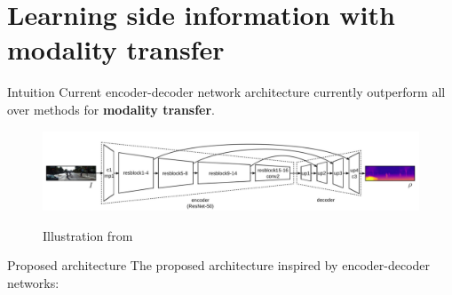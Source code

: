 \section{Learning side information with modality transfer}

\label{subsec:modality}

\begin{frame}{Intuition}
	\vfill
	Current encoder-decoder network architecture currently outperform all over methods for \textbf{modality transfer}.
	\vfill
	\begin{figure}
		\centering
		\includegraphics[width=\linewidth]{images/depth_inference/kusnietzov.png}
		
		Illustration from~\cite{Kuznietsov2017}
	\end{figure}
	\vfill
\end{frame}


\begin{frame}{Proposed architecture}
	\vfill
	The proposed architecture inspired by encoder-decoder networks:
	\vfill
	\begin{figure}
		\centering
		\end{figure}
	\vfill
\end{frame}


